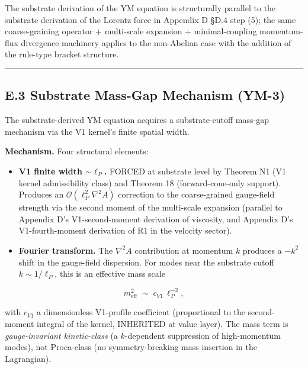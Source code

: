 \documentclass[
]{article}
\providecommand{\tightlist}{%
  \setlength{\itemsep}{0pt}\setlength{\parskip}{0pt}}
\begin{document}
The substrate derivation of the YM equation is structurally parallel to
the substrate derivation of the Lorentz force in Appendix D §D.4 step
(5); the same coarse-graining operator + multi-scale expansion +
minimal-coupling momentum-flux divergence machinery applies to the
non-Abelian case with the addition of the rule-type bracket structure.

\begin{center}\rule{0.5\linewidth}{0.5pt}\end{center}

\subsection{E.3 Substrate Mass-Gap Mechanism
(YM-3)}\label{e.3-substrate-mass-gap-mechanism-ym-3}

The substrate-derived YM equation acquires a substrate-cutoff mass-gap
mechanism via the V1 kernel's finite spatial width.

\textbf{Mechanism.} Four structural elements:

\begin{itemize}
\tightlist
\item
  \textbf{V1 finite width \(\sim \ell_P\).} FORCED at substrate level by
  Theorem N1 (V1 kernel admissibility class) and Theorem 18
  (forward-cone-only support). Produces an
  \(\mathcal{O}(\ell_P^2\nabla^2 A)\) correction to the coarse-grained
  gauge-field strength via the second moment of the multi-scale
  expansion (parallel to Appendix D's V1-second-moment derivation of
  viscosity, and Appendix D's V1-fourth-moment derivation of R1 in the
  velocity sector).
\item
  \textbf{Fourier transform.} The \(\nabla^2 A\) contribution at
  momentum \(k\) produces a \(-k^2\) shift in the gauge-field
  dispersion. For modes near the substrate cutoff \(k \sim 1/\ell_P\),
  this is an effective mass scale
\end{itemize}

\[m_\mathrm{eff}^2 \;\sim\; c_{V1}\,\ell_P^{-2},\]

with \(c_{V1}\) a dimensionless V1-profile coefficient (proportional to
the second-moment integral of the kernel, INHERITED at value layer). The
mass term is \emph{gauge-invariant kinetic-class} (a \(k\)-dependent
suppression of high-momentum modes), not Proca-class (no
symmetry-breaking mass insertion in the Lagrangian).
\end{document}
